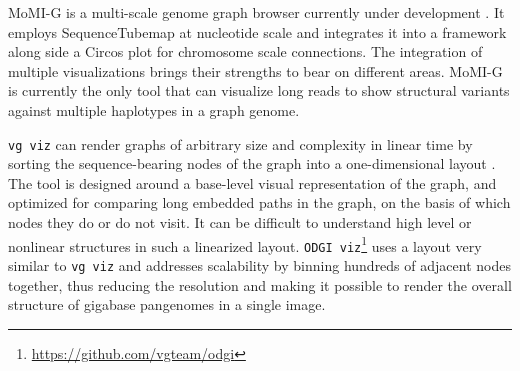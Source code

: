 


MoMI-G is a multi-scale genome graph browser currently under development \cite{yokoyama_momi-g:_2019}. 
It employs SequenceTubemap at nucleotide scale and integrates it into a framework along side a Circos \cite{Krzywinski_2009_Circos} plot for chromosome scale connections. 
The integration of multiple visualizations brings their strengths to bear on different areas. 
MoMI-G is currently the only tool that can visualize long reads to show structural variants against multiple haplotypes in a graph genome.

\texttt{vg viz} can render graphs of arbitrary size and complexity in linear time by sorting the sequence-bearing nodes of the graph into a one-dimensional layout \citep{Garrison_2019}. 
The tool is designed around a base-level visual representation of the graph, and optimized for comparing long embedded paths in the graph, on the basis of which nodes they do or do not visit. 
It can be difficult to understand high level or nonlinear structures in such a linearized layout. 
\texttt{ODGI viz}\footnote{\url{https://github.com/vgteam/odgi}} uses a layout very similar to \texttt{vg viz} and addresses scalability by binning hundreds of adjacent nodes together, thus reducing the resolution and making it possible to render the overall structure of gigabase pangenomes in a single image.

